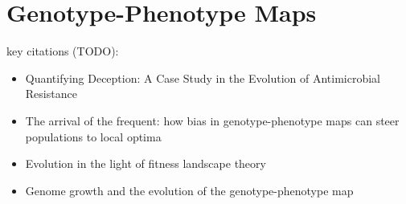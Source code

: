 \section{Genotype-Phenotype Maps}
\label{sec:genotype-phenotype-maps}

key citations (TODO):
\begin{itemize}
  \item Quantifying Deception: A Case Study in the Evolution of Antimicrobial Resistance \citep{eppstein2016quantifying}
  \item The arrival of the frequent: how bias in genotype-phenotype maps can steer populations to local optima \citep{schaper2014arrival}
  \item Evolution in the light of fitness landscape theory \citep{fragata2019evolution}
  \item Genome growth and the evolution of the genotype-phenotype map \citep{altenberg1995genome}
\end{itemize}
